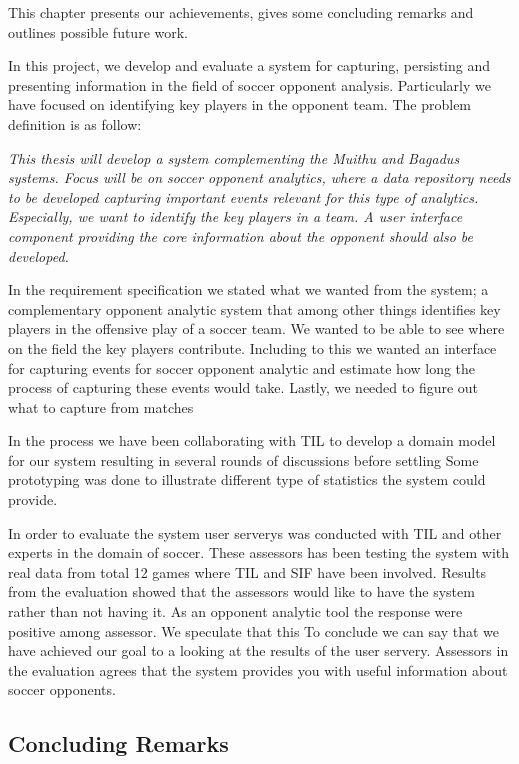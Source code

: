 This chapter presents our achievements, gives some concluding remarks and outlines possible future work.

In this project, we develop and evaluate a system for capturing, persisting and presenting information in the field of soccer opponent analysis. Particularly we have focused on identifying key players in the opponent team. The problem definition is as follow:

\textit{This thesis will develop a system complementing the Muithu and Bagadus systems. Focus will be on soccer opponent analytics, where a data repository needs to be developed capturing important events relevant for this type of analytics. Especially, we want to identify the key players in a team. A user interface component providing the core information about the opponent should also be developed.}

In the requirement specification we stated what we wanted from the system; a complementary opponent analytic system that among other things identifies key players in the offensive play of a soccer team. We wanted to be able to see where on the field the key players contribute. Including to this we wanted an interface for capturing events for soccer opponent analytic and estimate how long the process of capturing these events would take. Lastly, we needed to figure out what to capture from matches

In the process we have been collaborating with \ac{TIL} to develop a domain model for our system resulting in several rounds of discussions before settling Some prototyping was done to illustrate different type of statistics the system could provide.

In order to evaluate the system user serverys was conducted with \ac{TIL} and other experts in the domain of soccer. These assessors has been testing the system with real data from total 12 games where \ac{TIL} and \ac{SIF} have been involved. Results from the evaluation showed that the assessors would like to have the system rather than not having it. As an opponent analytic tool the response were positive among assessor. We speculate that this 
To conclude we can say that we have achieved our goal to a looking at the results of the user servery. Assessors in the evaluation agrees that the system provides you with useful information about soccer opponents. 

\subsection{Concluding Remarks}

